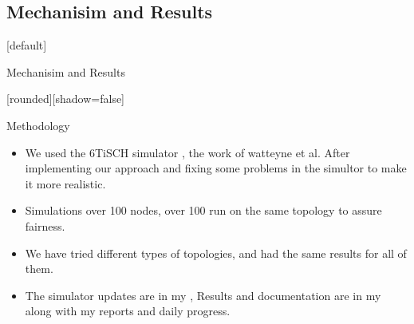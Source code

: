 \documentclass{beamer}
\makeatletter
\newenvironment{withoutheadline}{
        \setbeamertemplate{headline}[default]
        \def\beamer@entrycode{\vspace*{-\headheight}}
    }{}
\makeatother
\begin{document}
\subsection{Mechanisim and Results}
\begin{withoutheadline}
\begin{frame}{Mechanisim and Results}


[rounded][shadow=false]


\begin{block}{Methodology}

    \begin{itemize}
    \item We used the 6TiSCH simulator \href{https://bitbucket.org/6tisch/simulator/src}{}, the work of watteyne et al. After implementing our approach and fixing some problems in the simultor to make it more realistic. 
    \item Simulations over 100 nodes, over 100 run on the same topology to assure fairness.
    \item We have tried different types of topologies, and had the same results for all of them. 
    \item The simulator updates are in my \href{https://github.com/alijawadfahs/6tisch}{}, Results and documentation are in my \href{https://masterthesis2017.000webhostapp.com/}{} along with my reports and daily progress.
    
    \end{itemize}
    \end{block}


\end{frame}
\end{withoutheadline}
\end{document}
